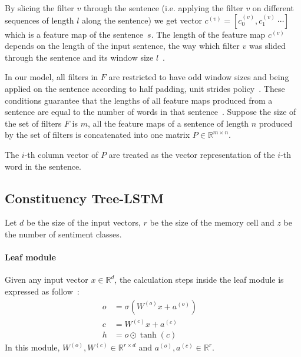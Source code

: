 By slicing the filter \(v\) through the sentence (i.e. applying the filter \(v\) on different sequences of length \(l\) along the sentence) we get vector \(c^{(v)} = [c^{(v)}_0, c^{(v)}_1~\cdots]\) which is a feature map of the sentence~\(s\).
The length of the feature map \(c^{(v)}\) depends on the length of the input sentence, the way which filter \(v\) was slided through the sentence and its window size \(l\)~\cite{conv-arith}.

In our model, all filters in \(F\) are restricted to have odd window sizes and being applied on the sentence according to half padding, unit strides policy~\cite{conv-arith}.
These conditions guarantee that the lengths of all feature maps produced from a sentence are equal to the number of words in that sentence~\cite{conv-arith}.
Suppose the size of the set of filters \(F\) is \(m\), all the feature maps of a sentence of length \(n\) produced by the set of filters is concatenated into one matrix \(P \in \mathbb{R}^{m \times n}\).

The \(i\)-th column vector of \(P\) are treated as the vector representation of the \(i\)-th word in the sentence.


\subsection{Constituency Tree-LSTM}\label{treelstm}
Let \(d\) be the size of the input vectors, \(r
\) be the size of the memory cell and \(z\) be the number of sentiment classes.
\paragraph{Leaf module}
Given any input vector \(x \in \mathbb{R}^d\), the calculation steps inside the leaf module is expressed as follow~\cite{treeLSTM}:
\begin{align}
o &= \sigma{\left( W^{(o)} x + a^{\left(o\right)}\right)} & \\
c &= W^{(c)} x + a^{(c)} & \\
h &= o \odot \tanh{\left(c\right)} &
\end{align}
In this module, \(W^{(o)}, W^{(c)} \in \mathbb{R}^{r \times d}\) and \(a^{\left(o\right)}, a^{(c)} \in \mathbb{R}^r\).
